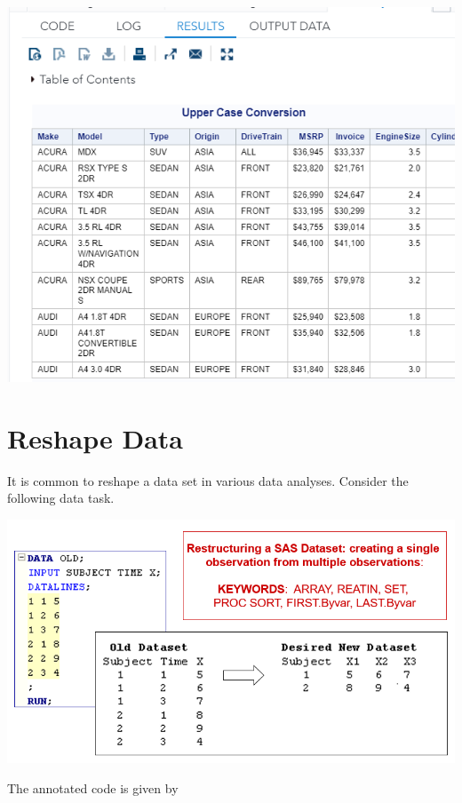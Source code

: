 \documentclass[
]{book}
\begin{document}
\begin{center}\includegraphics[width=1\linewidth]{img11/w11-upperCaseConversion} \end{center}

\hypertarget{reshape-data}{%
\section{Reshape Data}\label{reshape-data}}

It is common to reshape a data set in various data analyses. Consider the following data task.

\begin{center}\includegraphics[width=1\linewidth]{img11/w11-reshapeTable} \end{center}

The annotated code is given by
\end{document}
